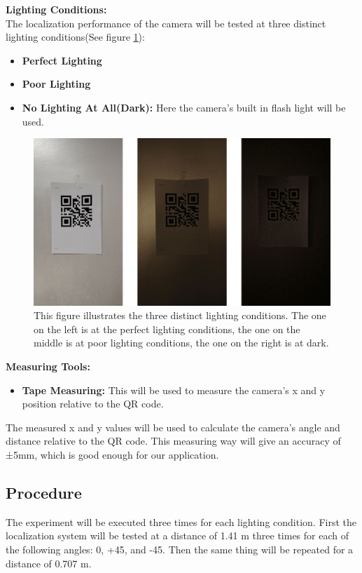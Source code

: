 \textbf{Lighting Conditions:}\\
The localization performance of the camera will be tested at three distinct lighting conditions(See figure \ref{Localization-Experiment-Lighting-Conditions}):
\begin{itemize}
	\item \textbf{Perfect Lighting}
	\item \textbf{Poor Lighting}
	\item \textbf{No Lighting At All(Dark):} Here the camera's built in flash light will be used.
\end{itemize}

\begin{figure}[h!]
	\centering
	\includegraphics[width=0.7\linewidth]{assets/ch4/Three lighting conditions/Three lighting conditions.png}
	\caption{This figure illustrates the three distinct lighting conditions. The one on the left is at the perfect lighting conditions, the one on the middle is at poor lighting conditions, the one on the right is at dark.}
	\label{Localization-Experiment-Lighting-Conditions}
\end{figure}

\textbf{Measuring Tools:}
\begin{itemize}
	\item \textbf{Tape Measuring:} This will be used to measure the camera's x and y position relative to the QR code.
\end{itemize}
The measured x and y values will be used to calculate the camera's angle and distance relative to the QR code. This measuring way will give an accuracy of ±5mm, which is good enough for our application.

\subsection{Procedure}\label{sec:procedure}
The experiment will be executed three times for each lighting condition. First the localization system will be tested at a distance of 1.41 m three times for each of the following angles: 0\textdegree, +45\textdegree, and -45\textdegree. Then the same thing will be repeated for a distance of 0.707 m.

